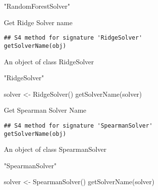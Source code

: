 \documentclass[a4paper]{book}
\begin{document}
%
\begin{Value}
"RandomForestSolver"
\end{Value}
%
\begin{Description}\relax
Get Ridge Solver name
\end{Description}
%
\begin{Usage}
\begin{verbatim}
## S4 method for signature 'RidgeSolver'
getSolverName(obj)
\end{verbatim}
\end{Usage}
%
\begin{Arguments}
\begin{ldescription}
\item[\code{obj}] An object of class RidgeSolver
\end{ldescription}
\end{Arguments}
%
\begin{Value}
"RidgeSolver"
\end{Value}
%
\begin{Examples}
\begin{ExampleCode}
solver <- RidgeSolver()
getSolverName(solver)
\end{ExampleCode}
\end{Examples}
%
\begin{Description}\relax
Get Spearman Solver Name
\end{Description}
%
\begin{Usage}
\begin{verbatim}
## S4 method for signature 'SpearmanSolver'
getSolverName(obj)
\end{verbatim}
\end{Usage}
%
\begin{Arguments}
\begin{ldescription}
\item[\code{obj}] An object of class SpearmanSolver
\end{ldescription}
\end{Arguments}
%
\begin{Value}
"SpearmanSolver"
\end{Value}
%
\begin{Examples}
\begin{ExampleCode}
solver <- SpearmanSolver()
getSolverName(solver)
\end{ExampleCode}
\end{Examples}
\end{document}
